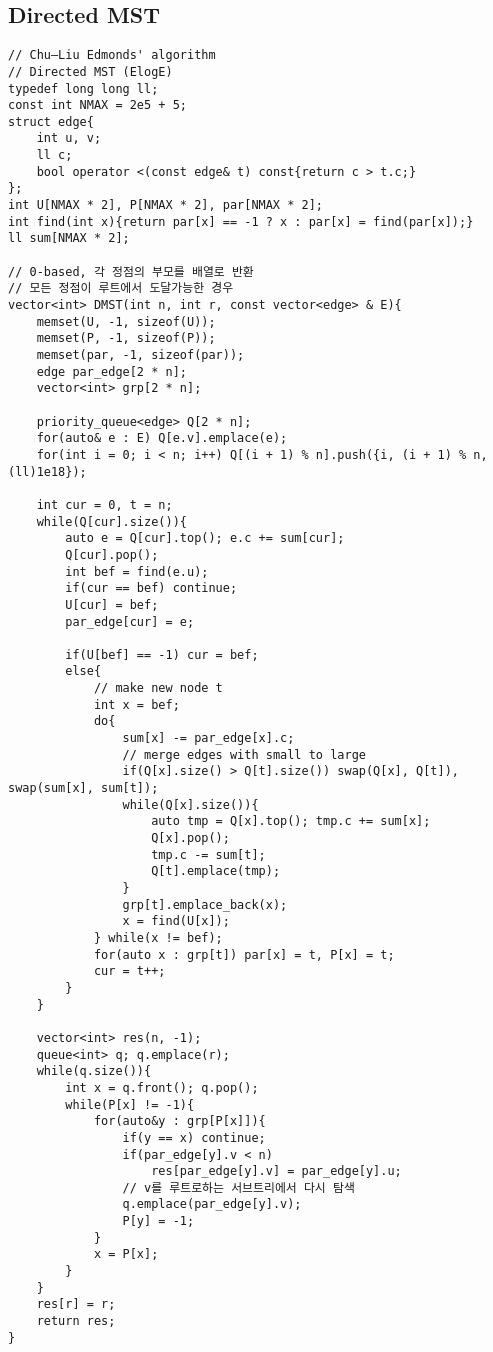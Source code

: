 \documentclass[landscape, 8pt, a4paper, oneside, twocolumn]{extarticle}
\begin{document}
\subsection {Directed MST}
\begin{verbatim}
// Chu–Liu Edmonds' algorithm 
// Directed MST (ElogE)
typedef long long ll;
const int NMAX = 2e5 + 5;
struct edge{
    int u, v;
    ll c;
    bool operator <(const edge& t) const{return c > t.c;}
};
int U[NMAX * 2], P[NMAX * 2], par[NMAX * 2];
int find(int x){return par[x] == -1 ? x : par[x] = find(par[x]);}
ll sum[NMAX * 2];

// 0-based, 각 정점의 부모를 배열로 반환
// 모든 정점이 루트에서 도달가능한 경우
vector<int> DMST(int n, int r, const vector<edge> & E){
    memset(U, -1, sizeof(U));
    memset(P, -1, sizeof(P));
    memset(par, -1, sizeof(par));
    edge par_edge[2 * n];
    vector<int> grp[2 * n];

    priority_queue<edge> Q[2 * n];
    for(auto& e : E) Q[e.v].emplace(e);
    for(int i = 0; i < n; i++) Q[(i + 1) % n].push({i, (i + 1) % n, (ll)1e18});
    
    int cur = 0, t = n;
    while(Q[cur].size()){
        auto e = Q[cur].top(); e.c += sum[cur];
        Q[cur].pop();
        int bef = find(e.u);
        if(cur == bef) continue;
        U[cur] = bef;
        par_edge[cur] = e;

        if(U[bef] == -1) cur = bef;
        else{
            // make new node t
            int x = bef;
            do{
                sum[x] -= par_edge[x].c;
                // merge edges with small to large
                if(Q[x].size() > Q[t].size()) swap(Q[x], Q[t]), swap(sum[x], sum[t]);
                while(Q[x].size()){
                    auto tmp = Q[x].top(); tmp.c += sum[x];
                    Q[x].pop();
                    tmp.c -= sum[t];
                    Q[t].emplace(tmp);
                }
                grp[t].emplace_back(x);
                x = find(U[x]);
            } while(x != bef);
            for(auto x : grp[t]) par[x] = t, P[x] = t;
            cur = t++;
        }
    }

    vector<int> res(n, -1);
    queue<int> q; q.emplace(r);
    while(q.size()){
        int x = q.front(); q.pop();
        while(P[x] != -1){
            for(auto&y : grp[P[x]]){
                if(y == x) continue;
                if(par_edge[y].v < n)
                    res[par_edge[y].v] = par_edge[y].u;
                // v를 루트로하는 서브트리에서 다시 탐색
                q.emplace(par_edge[y].v);
                P[y] = -1;
            }
            x = P[x];
        }
    }
    res[r] = r;
    return res;
}
\end{verbatim}
\newpage
\end{document}
